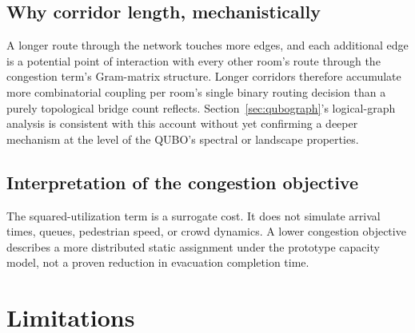 \documentclass[11pt]{article}
\begin{document}
\subsection{Why corridor length, mechanistically}
A longer route through the network touches more edges, and each additional edge is a potential point of interaction with every other room's route through the congestion term's Gram-matrix structure. Longer corridors therefore accumulate more combinatorial coupling per room's single binary routing decision than a purely topological bridge count reflects. Section~\ref{sec:qubograph}'s logical-graph analysis is consistent with this account without yet confirming a deeper mechanism at the level of the QUBO's spectral or landscape properties.

\subsection{Interpretation of the congestion objective}
The squared-utilization term is a surrogate cost. It does not simulate arrival times, queues, pedestrian speed, or crowd dynamics. A lower congestion objective describes a more distributed static assignment under the prototype capacity model, not a proven reduction in evacuation completion time.

\section{Limitations}
\label{sec:limitations}
\end{document}
